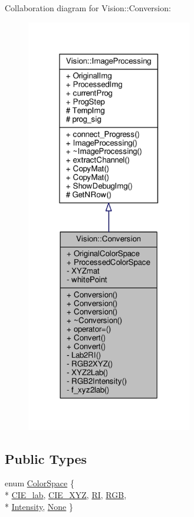 Collaboration diagram for Vision\+:\+:Conversion\+:\nopagebreak
\begin{figure}[H]
\begin{center}
\leavevmode
\includegraphics[width=205pt]{class_vision_1_1_conversion__coll__graph}
\end{center}
\end{figure}
\subsection*{Public Types}
\begin{DoxyCompactItemize}
\item 
enum \hyperlink{class_vision_1_1_conversion_a0a21d4ccbb013185f1974d35ec86e388}{Color\+Space} \{ \\*
\hyperlink{class_vision_1_1_conversion_a0a21d4ccbb013185f1974d35ec86e388afd9ec9933d500e5eeec6ce3359321b0e}{C\+I\+E\+\_\+lab}, 
\hyperlink{class_vision_1_1_conversion_a0a21d4ccbb013185f1974d35ec86e388ad4dfd3a535a86b69dd0e32ae7598b590}{C\+I\+E\+\_\+\+X\+Y\+Z}, 
\hyperlink{class_vision_1_1_conversion_a0a21d4ccbb013185f1974d35ec86e388addf2a4063c4fe27e2675fafccdcdd9c1}{R\+I}, 
\hyperlink{class_vision_1_1_conversion_a0a21d4ccbb013185f1974d35ec86e388af3fab43e1e6d8ffab1bf27050866a8d5}{R\+G\+B}, 
\\*
\hyperlink{class_vision_1_1_conversion_a0a21d4ccbb013185f1974d35ec86e388abfa5e56d2444f73ce850195468885fdd}{Intensity}, 
\hyperlink{class_vision_1_1_conversion_a0a21d4ccbb013185f1974d35ec86e388a471c24ee3ed6a2bce23140af4ee3a00d}{None}
 \}
\end{DoxyCompactItemize}
